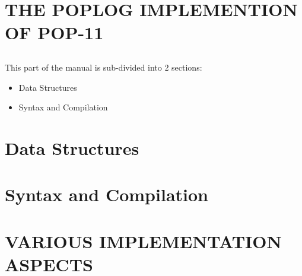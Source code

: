 \part{THE POPLOG IMPLEMENTION OF POP-11}


\chapter*{}
\begin{flushright}
\vspace{1in}
\parbox{5.2in}{


This part of the manual is sub-divided into 2 sections:

\begin{itemize}
  \item Data Structures
  \item Syntax and Compilation
\end{itemize}
}
\end{flushright}


\part*{Data Structures}




\part*{Syntax and Compilation}



\part{VARIOUS IMPLEMENTATION ASPECTS}

